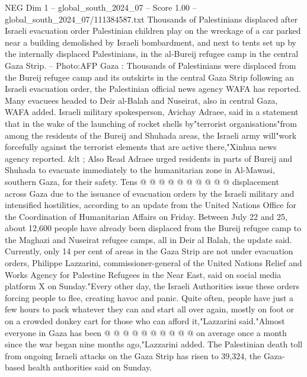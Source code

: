 \begin{textsample}{NEG Dim 1 – global\_south\_2024\_07 – Score 1.00 – global\_south\_2024\_07/111384587.txt}  \label{ex:f1_neg_387}
Thousands of Palestinians displaced after Israeli evacuation order Palestinian children play on the wreckage of a car parked near a building demolished by Israeli bombardment, and next to tents set up by the internally displaced Palestinians, in the al-Bureij refugee camp in the central Gaza Strip. -- Photo:AFP Gaza : Thousands of Palestinians were displaced from the Bureij refugee camp and its outskirts in the central Gaza Strip following an Israeli evacuation order, the Palestinian official news agency WAFA has reported.
Many evacuees headed to Deir al-Balah and Nuseirat, also in central Gaza, WAFA added.
Israeli military spokesperson, Avichay Adraee, said in a statement that in the wake of the launching of rocket shells by"terrorist organisations"from among the residents of the Bureij and Shuhada areas, the Israeli army will"work forcefully against the terrorist elements that are active there,"Xinhua news agency reported. \&lt ; Also Read Adraee urged residents in parts of Bureij and Shuhada to evacuate immediately to the humanitarian zone in Al-Mawasi, southern Gaza, for their safety.
Tens @ @ @ @ @ @ @ @ @ @ displacement across Gaza due to the issuance of evacuation orders by the Israeli military and intensified hostilities, according to an update from the United Nations Office for the Coordination of Humanitarian Affairs on Friday.
Between July 22 and 25, about 12,600 people have already been displaced from the Bureij refugee camp to the Maghazi and Nuseirat refugee camps, all in Deir al Balah, the update said.
Currently, only 14 per cent of areas in the Gaza Strip are not under evacuation orders, Philippe Lazzarini, commissioner-general of the United Nations Relief and Works Agency for Palestine Refugees in the Near East, said on social media platform X on Sunday."Every other day, the Israeli Authorities issue these orders forcing people to flee, creating havoc and panic.
Quite often, people have just a few hours to pack whatever they can and start all over again, mostly on foot or on a crowded donkey cart for those who can afford it,"Lazzarini said."Almost everyone in Gaza has been @ @ @ @ @ @ @ @ @ @ on average once a month since the war began nine months ago,"Lazzarini added.
The Palestinian death toll from ongoing Israeli attacks on the Gaza Strip has risen to 39,324, the Gaza-based health authorities said on Sunday.

\end{textsample}
